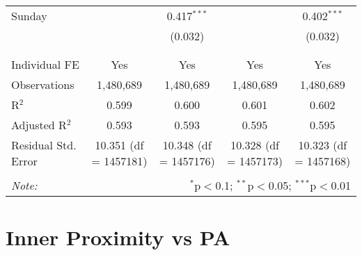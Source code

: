 \documentclass[
]{article}
\begin{document}
\begin{table}[!htbp]
{\begin{tabular}{@{\extracolsep{5pt}}lcccc}
 Sunday &  & 0.417$^{***}$ &  & 0.402$^{***}$ \\ 
  &  & (0.032) &  & (0.032) \\ 
  & & & & \\ 
\hline \\[-1.8ex] 
Individual FE & Yes & Yes & Yes & Yes \\ 
Observations & 1,480,689 & 1,480,689 & 1,480,689 & 1,480,689 \\ 
R$^{2}$ & 0.599 & 0.600 & 0.601 & 0.602 \\ 
Adjusted R$^{2}$ & 0.593 & 0.593 & 0.595 & 0.595 \\ 
Residual Std. Error & 10.351 (df = 1457181) & 10.348 (df = 1457176) & 10.328 (df = 1457173) & 10.323 (df = 1457168) \\ 
\hline 
\hline \\[-1.8ex] 
\textit{Note:}  & \multicolumn{4}{r}{$^{*}$p$<$0.1; $^{**}$p$<$0.05; $^{***}$p$<$0.01} \\ 
\end{tabular}
} 
\end{table} 
\newpage
\section{Inner Proximity vs PA}
\end{document}
